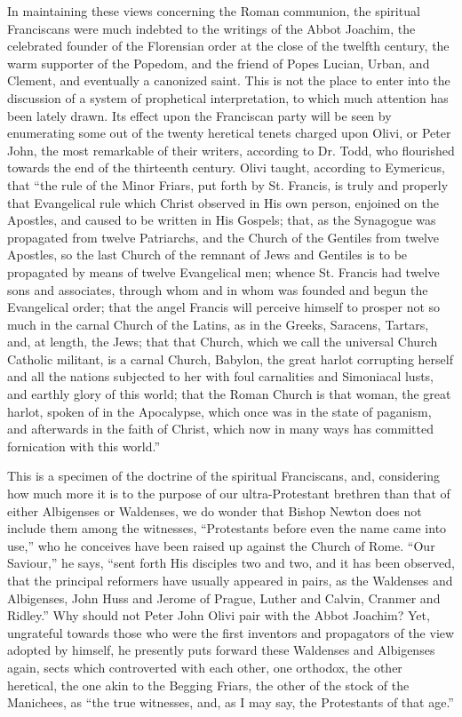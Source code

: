 In maintaining these views concerning the Roman communion, the
spiritual Franciscans were much indebted to the writings of the Abbot
Joachim, the celebrated founder of the Florensian order at the close
of the twelfth century, the warm supporter of the Popedom, and the
friend of Popes Lucian, Urban, and Clement, and eventually a canonized
saint. This is not the place to enter into the discussion of a system
of prophetical interpretation, to which much attention has been lately
drawn. Its effect upon the Franciscan party will be seen by
enumerating some out of the twenty heretical tenets charged upon Olivi,
or Peter John, the most remarkable of their writers, according to Dr.
Todd, who flourished towards the end of the thirteenth century. Olivi
taught, according to Eymericus, that ``the rule of the Minor
Friars, put forth by St. Francis, is truly and properly that
Evangelical rule which Christ observed in His own person, enjoined on
the Apostles, and caused to be written in His Gospels; that, as the
Synagogue was propagated from twelve Patriarchs, and the Church of the
Gentiles from twelve Apostles, so the last Church of the remnant of
Jews and Gentiles is to be propagated by means of twelve Evangelical
men; whence St. Francis had twelve sons and associates, through whom
and in whom was founded and begun the Evangelical order; that the
angel Francis will perceive himself to prosper not so much in the
carnal Church of the Latins, as in the Greeks, Saracens, Tartars, and,
at length, the Jews; that that Church, which we call the universal
Church Catholic militant, is a carnal Church, Babylon, the great
harlot corrupting herself and all the nations subjected to her with
foul carnalities and Simoniacal lusts, and earthly glory of this
world; that the Roman Church is that woman, the great harlot, spoken
of in the Apocalypse, which once was in the state of paganism, and
afterwards in the faith of Christ, which now in many ways has
committed fornication with this world.''

This is a specimen of the doctrine of the spiritual Franciscans,
and, considering how much more it is to the purpose of our
ultra-Protestant brethren than that of either Albigenses or Waldenses,
we do wonder that Bishop Newton does not include them among the
witnesses, ``Protestants before even the name came into use,''
who he conceives have been raised up against the Church of Rome.
``Our Saviour,'' he says, ``sent forth His disciples two
and two, and it has been observed, that the principal reformers have
usually appeared in pairs, as the Waldenses and Albigenses, John Huss
and Jerome of Prague, Luther and Calvin, Cranmer and Ridley.'' Why
should not Peter John Olivi pair with the Abbot Joachim? Yet,
ungrateful towards those who were the first inventors and propagators
of the view adopted by himself, he presently puts forward these
Waldenses and Albigenses again, sects which controverted with each
other, one orthodox, the other heretical, the one akin to the Begging
Friars, the other of the stock of the Manichees, as ``the true
witnesses, and, as I may say, the Protestants of that age.''

